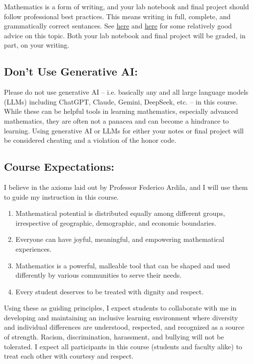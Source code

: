 \documentclass[11pt,letterpaper]{article}
\begin{document}
Mathematics is a form of writing, and your lab notebook and final project should follow professional best practices. This means writing in full, complete, and grammatically correct sentances. See \href{https://math.mit.edu/~poonen/papers/writing.pdf}{here} and \href{https://www.math.ucla.edu/~pak/papers/how-to-write1.pdf}{here} for some relatively good advice on this topic. Both your lab notebook and final project will be graded, in part, on your writing.

\subsection*{Don't Use Generative AI:}

Please do not use generative AI -- i.e. basically any and all large language models (LLMs) including ChatGPT, Claude, Gemini, DeepSeek, etc. -- in this course. While these can be helpful tools in learning mathematics, especially advanced mathematics, they are often not a panacea and can become a hindrance to learning. Using generative AI or LLMs for either your notes or final project will be considered cheating and a violation of the honor code.

\subsection*{Course Expectations:}

I believe in the axioms laid out by Professor Federico Ardila, and I will use them to guide my instruction in this course.

\begin{enumerate}
\item Mathematical potential is distributed equally among different groups, irrespective of geographic, demographic, and economic boundaries.
\item Everyone can have joyful, meaningful, and empowering mathematical experiences.
\item Mathematics is a powerful, malleable tool that can be shaped and used differently by various communities to serve their needs.
\item Every student deserves to be treated with dignity and respect.
\end{enumerate}

Using these as guiding principles, I expect students to collaborate with me in developing and maintaining an inclusive learning environment where diversity and individual differences are understood, respected, and recognized as a source of strength. Racism, discrimination, harassment, and bullying will not be tolerated. I expect all participants in this course (students and faculty alike) to treat each other with courtesy and respect.
\end{document}
